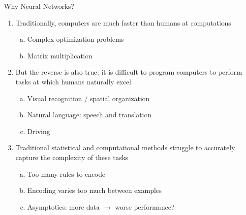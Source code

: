 \documentclass{beamer}
\begin{document}

\begin{frame}{Why Neural Networks?}
\begin{enumerate}[1.]
    \item Traditionally, computers are much faster than humans at computations
        \begin{enumerate}[a.]
            \item Complex optimization problems 
            \item Matrix multiplication
        \end{enumerate}
    \item But the reverse is also true; it is difficult to program computers to perform tasks at which humans naturally excel
        \begin{enumerate}[a.]
            \item Visual recognition / spatial organization
            \item Natural language: speech and translation
            \item Driving
        \end{enumerate}
    \item Traditional statistical and computational methods struggle to accurately capture the complexity of these tasks
        \begin{enumerate}[a.]
            \item Too many rules to encode
            \item Encoding varies too much between examples
            \item Asymptotics: more data $\rightarrow$ worse performance?
        \end{enumerate}
\end{enumerate}
\end{frame}
\end{document}
